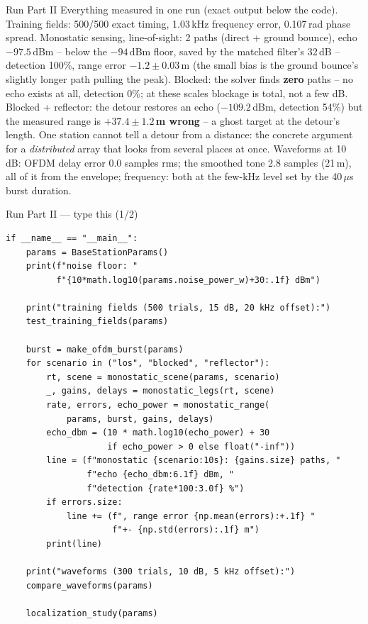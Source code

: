 \documentclass[10pt]{beamer}
\begin{document}
\begin{frame}{Run Part II}
  Everything measured in one run (exact output below the
  code). Training fields: 500/500 exact timing, 1.03\,kHz
  frequency error, 0.107\,rad phase spread. Monostatic
  sensing, line-of-sight: 2 paths (direct + ground bounce),
  echo $-97.5$\,dBm -- below the $-94$\,dBm floor, saved by
  the matched filter's 32\,dB -- detection 100\%, range
  error $-1.2 \pm 0.03$\,m (the small bias is the ground
  bounce's slightly longer path pulling the peak). Blocked:
  the solver finds \textbf{zero} paths -- no echo exists at
  all, detection 0\%; at these scales blockage is total,
  not a few dB. Blocked + reflector: the detour restores an
  echo ($-109.2$\,dBm, detection 54\%) but the measured
  range is \textbf{$+37.4 \pm 1.2$\,m wrong} -- a ghost
  target at the detour's length. One station cannot tell a
  detour from a distance: the concrete argument for a
  \emph{distributed} array that looks from several places
  at once. Waveforms at 10\,dB: OFDM delay error 0.0
  samples rms; the smoothed tone 2.8 samples (21\,m), all
  of it from the envelope; frequency: both at the few-kHz
  level set by the 40\,$\mu$s burst duration.
\end{frame}

\begin{frame}[fragile]{Run Part II --- type this (1/2)}
\begin{lstlisting}[basicstyle=\ttfamily\tiny]
if __name__ == "__main__":
    params = BaseStationParams()
    print(f"noise floor: "
          f"{10*math.log10(params.noise_power_w)+30:.1f} dBm")

    print("training fields (500 trials, 15 dB, 20 kHz offset):")
    test_training_fields(params)

    burst = make_ofdm_burst(params)
    for scenario in ("los", "blocked", "reflector"):
        rt, scene = monostatic_scene(params, scenario)
        _, gains, delays = monostatic_legs(rt, scene)
        rate, errors, echo_power = monostatic_range(
            params, burst, gains, delays)
        echo_dbm = (10 * math.log10(echo_power) + 30
                    if echo_power > 0 else float("-inf"))
        line = (f"monostatic {scenario:10s}: {gains.size} paths, "
                f"echo {echo_dbm:6.1f} dBm, "
                f"detection {rate*100:3.0f} %")
        if errors.size:
            line += (f", range error {np.mean(errors):+.1f} "
                     f"+- {np.std(errors):.1f} m")
        print(line)

    print("waveforms (300 trials, 10 dB, 5 kHz offset):")
    compare_waveforms(params)

    localization_study(params)
\end{lstlisting}
\end{frame}
\end{document}
